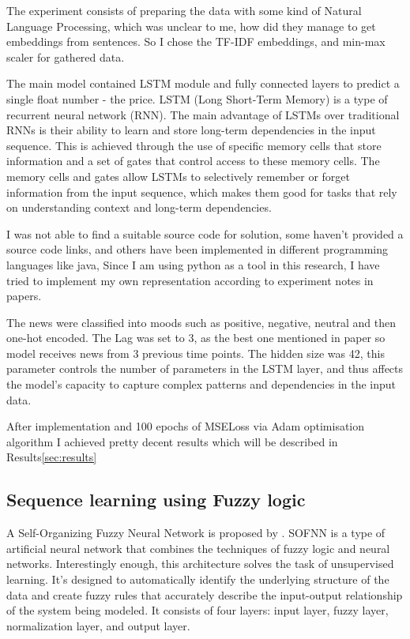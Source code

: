 \documentclass{article}
\begin{document}
The experiment consists of preparing the data with some kind of Natural Language Processing, which was unclear to me, how did they manage to get embeddings from sentences. So I chose the TF-IDF embeddings, and min-max scaler for gathered data.

The main model contained LSTM \cite{HochSchm97} module and fully connected layers to predict a single float number - the price.
LSTM (Long Short-Term Memory) is a type of recurrent neural network (RNN). The main advantage of LSTMs over traditional RNNs is their ability to learn and store long-term dependencies in the input sequence. This is achieved through the use of specific memory cells that store information and a set of gates that control access to these memory cells. 
The memory cells and gates allow LSTMs to selectively remember or forget information from the input sequence, which makes them good for tasks that rely on understanding context and long-term dependencies.

I was not able to find a suitable source code for solution, some haven't provided a source code links, and others have been implemented in different programming languages like java, 
Since I am using python as a tool in this research, I have tried to implement my own representation according to experiment notes in papers.

The news were classified into moods such as positive, negative, neutral and then one-hot encoded.
The Lag was set to 3, as the best one mentioned in paper so model receives news from 3 previous time points. The hidden size was 42, this parameter controls the number of parameters in the LSTM layer, and thus affects the model's capacity to capture complex patterns and dependencies in the input data.

After implementation and 100 epochs of MSELoss via Adam optimisation algorithm I achieved pretty decent results which will be described in Results\ref{sec:results}

\subsection{Sequence learning using Fuzzy logic}

A Self-Organizing Fuzzy Neural Network is proposed by \cite{SalimiBadr2022}.
SOFNN is a type of artificial neural network that combines the techniques of fuzzy logic and neural networks.
Interestingly enough, this architecture solves the task of unsupervised learning.
It's designed to automatically identify the underlying structure of the data and create fuzzy rules that accurately describe the input-output relationship of the system being modeled. It consists of four layers: input layer, fuzzy layer, normalization layer, and output layer.
\end{document}
